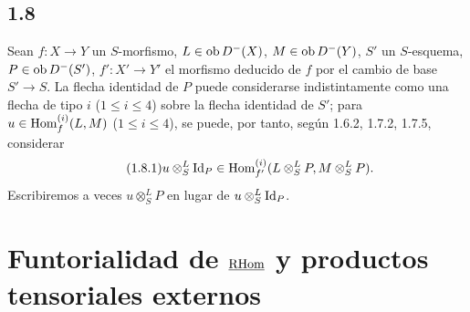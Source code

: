 \subsection*{1.8}
Sean $f:X\to Y$ un $S$-morfismo, $L\in\operatorname{ob} D^{-}(X)$, $M\in\operatorname{ob} D^{-}(Y)$, $S'$ un $S$-esquema, $P\in\operatorname{ob} D^{-}(S')$, $f':X'\to Y'$ el morfismo deducido de $f$ por el cambio de base $S'\to S$. La flecha identidad de $P$ puede considerarse indistintamente como una flecha de tipo $i$ ($1\leq i\leq4$) sobre la flecha identidad de $S'$; para $u\in\operatorname{Hom}_f^{(i)}(L,M)$ ($1\leq i\leq4$), se puede, por tanto, según 1.6.2, 1.7.2, 1.7.5, considerar
\begin{equation}\tag{1.8.1}
u\otimes^{L}_{S}\mathrm{Id}_P\in\operatorname{Hom}_{f'}^{(i)}(L\otimes^{L}_{S}P,M\otimes^{L}_{S}P).
\end{equation}
Escribiremos a veces $u\otimes^{L}_{S}P$ en lugar de $u\otimes^{L}_{S}\mathrm{Id}_P$.

\section{Funtorialidad de \texorpdfstring{$\underline{\mathrm{RHom}}$}{RHom} y productos tensoriales externos}
